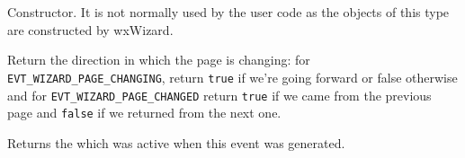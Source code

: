 
\label{wxwizardeventwxwizardevent}


Constructor. It is not normally used by the user code as the objects of this
type are constructed by wxWizard.

\label{wxwizardeventgetdirection}


Return the direction in which the page is changing: for {\tt
EVT\_WIZARD\_PAGE\_CHANGING}, return {\tt true} if we're going forward or
false otherwise and for {\tt EVT\_WIZARD\_PAGE\_CHANGED} return {\tt true} if
we came from the previous page and {\tt false} if we returned from the next
one.

\label{wxwizardeventgetpage}


Returns the  which was active when this
event was generated.

